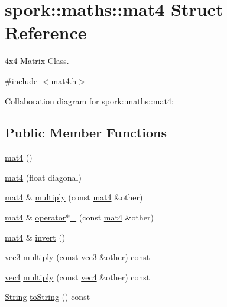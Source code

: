 \hypertarget{structspork_1_1maths_1_1mat4}{}\section{spork\+:\+:maths\+:\+:mat4 Struct Reference}
\label{structspork_1_1maths_1_1mat4}


4x4 Matrix Class.  




{\ttfamily \#include $<$mat4.\+h$>$}



Collaboration diagram for spork\+:\+:maths\+:\+:mat4\+:
\subsection*{Public Member Functions}
\begin{DoxyCompactItemize}
\item 
\hyperlink{structspork_1_1maths_1_1mat4_a819bc1d0966136278f3e6f56d4946095}{mat4} ()
\item 
\hyperlink{structspork_1_1maths_1_1mat4_a2e37be82e75a8986e43c63d0b3a2be46}{mat4} (float diagonal)
\item 
\hyperlink{structspork_1_1maths_1_1mat4}{mat4} \& \hyperlink{structspork_1_1maths_1_1mat4_a68bddd1d0d1f9a512138161230d53d48}{multiply} (const \hyperlink{structspork_1_1maths_1_1mat4}{mat4} \&other)
\item 
\hyperlink{structspork_1_1maths_1_1mat4}{mat4} \& \hyperlink{structspork_1_1maths_1_1mat4_a706a4d4c7946d3470af94b2466be3b6e}{operator$\ast$=} (const \hyperlink{structspork_1_1maths_1_1mat4}{mat4} \&other)
\item 
\hyperlink{structspork_1_1maths_1_1mat4}{mat4} \& \hyperlink{structspork_1_1maths_1_1mat4_a6b3f2da18fbf011ad5856ff83278ebe5}{invert} ()
\item 
\hyperlink{structspork_1_1maths_1_1vec3}{vec3} \hyperlink{structspork_1_1maths_1_1mat4_aca8372b7cd3bbffd3fdabde5bc4c8cde}{multiply} (const \hyperlink{structspork_1_1maths_1_1vec3}{vec3} \&other) const
\item 
\hyperlink{structspork_1_1maths_1_1vec4}{vec4} \hyperlink{structspork_1_1maths_1_1mat4_ab57d988ef0f1b080045b936668875dd6}{multiply} (const \hyperlink{structspork_1_1maths_1_1vec4}{vec4} \&other) const
\item 
\hyperlink{my_string_8h_afbeda3fd1bdc8c37d01bdf9f5c8274ff}{String} \hyperlink{structspork_1_1maths_1_1mat4_a051931c026a2c6efe06d1884c477bbbc}{to\+String} () const
\end{DoxyCompactItemize}
